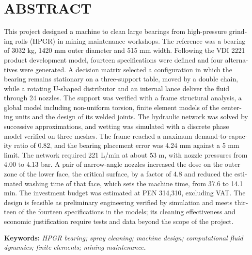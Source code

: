 \chapter*{ABSTRACT}

\begin{otherlanguage}{english}
This project designed a machine to clean large bearings from high-pressure grinding rolls (HPGR) in mining maintenance workshops. The reference was a bearing of 3032 kg, 1420 mm outer diameter and 515 mm width. Following the VDI 2221 product development model, fourteen specifications were defined and four alternatives were generated. A decision matrix selected a configuration in which the bearing remains stationary on a three-support table, moved by a double chain, while a rotating U-shaped distributor and an internal lance deliver the fluid through 24 nozzles. The support was verified with a frame structural analysis, a global model including non-uniform torsion, finite element models of the centering units and the design of its welded joints. The hydraulic network was solved by successive approximations, and wetting was simulated with a discrete phase model verified on three meshes. The frame reached a maximum demand-to-capacity ratio of 0.82, and the bearing placement error was 4.24 mm against a 5 mm limit. The network required 221 L/min at about 53 m, with nozzle pressures from 4.00 to 4.13 bar. A pair of narrow-angle nozzles increased the dose on the outer zone of the lower face, the critical surface, by a factor of 4.8 and reduced the estimated washing time of that face, which sets the machine time, from 37.6 to 14.1 min. The investment budget was estimated at PEN 314,310, excluding VAT. The design is feasible as preliminary engineering verified by simulation and meets thirteen of the fourteen specifications in the models; its cleaning effectiveness and economic justification require tests and data beyond the scope of the project.

\medskip
\noindent\textbf{Keywords:} \textit{HPGR bearing; spray cleaning; machine design; computational fluid dynamics; finite elements; mining maintenance.}
\end{otherlanguage}

